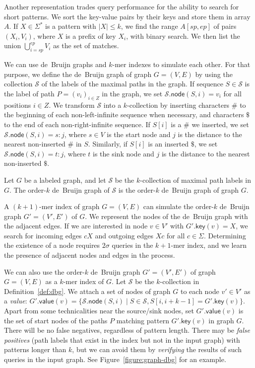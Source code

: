 \documentclass[a4paper,UKenglish]{lipics-v2016}
\newcommand{\set}[1]{\ensuremath{\{ #1 \}}}
\newcommand{\abs}[1]{\ensuremath{\lvert #1 \rvert}}
\newcommand{\gkey}{\ensuremath{\mathsf{key}}}
\newcommand{\gvalue}{\ensuremath{\mathsf{value}}}
\newcommand{\gnode}{\ensuremath{\mathsf{node}}}
\newcommand{\kmer}[1]{$#1$\nobreakdash-mer}
\newcommand{\kcollection}[1]{$#1$\nobreakdash-collection}
\newcommand{\orderk}[1]{order\nobreakdash-$#1$}
\begin{document}
Another representation trades query performance for the ability to search for short patterns. We sort the key-value pairs by their keys and store them in array $A$. If $X \in \Sigma^{\ast}$ is a pattern with $\abs{X} \le k$, we find the range $A[sp, ep]$ of pairs $(X_{i}, V_{i})$, where $X$ is a prefix of key $X_{i}$, with binary search. We then list the union $\bigcup_{i=sp}^{ep} V_{i}$ as the set of matches.

We can use de~Bruijn graphs and \kmer{k} indexes to simulate each other. For that purpose, we define the de~Bruijn graph of graph $G = (V, E)$ by using the collection $\mathcal{S}$ of the labels of the maximal paths in the graph. If sequence $S \in \mathcal{S}$ is the label of path $P = (v_{i})_{i \in Z}$ in the graph, we set $\mathcal{S}.\gnode(S, i) = v_{i}$ for all positions $i \in Z$. We transform $\mathcal{S}$ into a \kcollection{k} by inserting characters $\#$ to the beginning of each non-left-infinite sequence when necessary, and characters $\$$ to the end of each non-right-infinite sequence. If $S[i]$ is a $\#$ we inserted, we set $\mathcal{S}.\gnode(S, i) = s:j$, where $s \in V$ is the start node and $j$ is the distance to the nearest non-inserted $\#$ in $S$. Similarly, if $S[i]$ is an inserted $\$$, we set $\mathcal{S}.\gnode(S, i) = t:j$, where $t$ is the sink node and $j$ is the distance to the nearest non-inserted $\$$.

\begin{definition}\label{def:dbg}
Let $G$ be a labeled graph, and let $\mathcal{S}$ be the \kcollection{k} of maximal path labels in $G$. The \orderk{k} de~Bruijn graph of $\mathcal{S}$ is the \orderk{k} de~Bruijn graph of graph $G$.
\end{definition}

A \kmer{(k+1)} index of graph $G = (V, E)$ can simulate the \orderk{k} de~Bruijn graph $G' = (V', E')$ of $G$. We represent the nodes of the de~Bruijn graph with the adjacent edges. If we are interested in node $v \in V'$ with $G'.\gkey(v) = X$, we search for incoming edges $cX$ and outgoing edges $Xc$ for all $c \in \Sigma$. Determining the existence of a node requires $2 \sigma$ queries in the \kmer{k+1} index, and we learn the presence of adjacent nodes and edges in the process.

We can also use the \orderk{k} de~Bruijn graph $G' = (V', E')$ of graph $G = (V, E)$ as a \kmer{k} index of $G$. Let $\mathcal{S}$ be the \kcollection{k} in Definition~\ref{def:dbg}. We attach a set of nodes of graph $G$ to each node $v' \in V'$ as a \emph{value}: $G'.\gvalue(v) = \set{ \mathcal{S}.\gnode(S, i) \mid S \in \mathcal{S}, S[i, i+k-1] = G'.\gkey(v)}.$ Apart from some technicalities near the source/sink nodes, set $G'.\gvalue(v)$ is the set of start nodes of the paths $P$ matching pattern $G'.\gkey(v)$ in graph $G$. There will be no false negatives, regardless of pattern length. There may be \emph{false positives} (path labels that exist in the index but not in the input graph) with patterns longer than $k$, but we can avoid them by \emph{verifying} the results of such queries in the input graph. See Figure~\ref{figure:graph-dbg} for an example.
\end{document}
